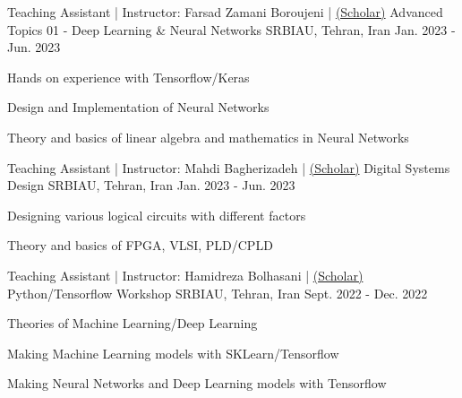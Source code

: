 


\begin{cventries}


\cventry
{Teaching Assistant | Instructor: Farsad Zamani Boroujeni | \href{https://scholar.google.com/citations?user=RENIRWwAAAAJ&hl=en}{(Scholar)}} %
{Advanced Topics 01 - Deep Learning \& Neural Networks} %
{SRBIAU, Tehran, Iran} %
{Jan. 2023 - Jun. 2023} %
{ %
\begin{cvitems}
\item {Hands on experience with Tensorflow/Keras}
\item {Design and Implementation of Neural Networks}
\item {Theory and basics of linear algebra and mathematics in Neural Networks}
\end{cvitems}
}


\cventry
{Teaching Assistant | Instructor: Mahdi Bagherizadeh | \href{https://scholar.google.com/citations?user=mvHPeQwAAAAJ&hl=en}{(Scholar)}} %
{Digital Systems Design} %
{SRBIAU, Tehran, Iran} %
{Jan. 2023 - Jun. 2023} %
{ %
\begin{cvitems}
\item {Designing various logical circuits with different factors}
\item {Theory and basics of FPGA, VLSI, PLD/CPLD}
\end{cvitems}
}


\cventry
{Teaching Assistant | Instructor: Hamidreza Bolhasani | \href{https://scholar.google.co.in/citations?user=JnHYS6EAAAAJ&hl=en}{(Scholar)}} %
{Python/Tensorflow Workshop} %
{SRBIAU, Tehran, Iran} %
{Sept. 2022 - Dec. 2022} %
{ %
\begin{cvitems}
\item {Theories of Machine Learning/Deep Learning}
\item {Making Machine Learning models with SKLearn/Tensorflow}
\item {Making Neural Networks and Deep Learning models with Tensorflow} 
\end{cvitems} 
}


\end{cventries}
